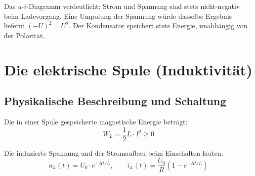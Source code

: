 ﻿\documentclass[12pt, a4paper]{article}
\begin{document}
	Das $u$-$i$-Diagramm verdeutlicht: Strom und Spannung sind stets nicht-negativ beim Ladevorgang. Eine Umpolung der Spannung würde dasselbe Ergebnis liefern: $(-U)^2 = U^2$. Der Kondensator speichert stets Energie, unabhängig von der Polarität.
	
	\section{Die elektrische Spule (Induktivität)}
	
	\subsection{Physikalische Beschreibung und Schaltung}
	
	Die in einer Spule gespeicherte magnetische Energie beträgt:
	\begin{equation}
		W_L = \frac{1}{2} L \cdot I^2 \geq 0
		\label{eq:spule_energie}
	\end{equation}
	
	Die induzierte Spannung und der Stromaufbau beim Einschalten lauten:
	\begin{equation}
		u_L(t) = U_0 \cdot e^{-Rt/L}, \qquad
		i_L(t) = \frac{U_0}{R}\left(1 - e^{-Rt/L}\right)
	\end{equation}
	
\end{document}

